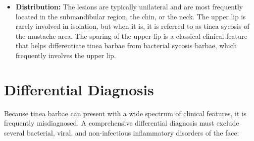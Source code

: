 \begin{itemize}
\begin{itemize}
        \item Symptoms of pain are minimal, though patients frequently report mild to moderate pruritus (itching) and a burning sensation, especially after shaving.
        \item Because the inflammation is superficial, systemic symptoms and scarring are generally absent, and hair growth typically returns to normal after successful treatment.
    \end{itemize}
    \item \textbf{Distribution:} The lesions are typically unilateral and are most frequently located in the submandibular region, the chin, or the neck. The upper lip is rarely involved in isolation, but when it is, it is referred to as tinea sycosis of the mustache area. The sparing of the upper lip is a classical clinical feature that helps differentiate tinea barbae from bacterial sycosis barbae, which frequently involves the upper lip.
\end{itemize}

\section*{Differential Diagnosis}
Because tinea barbae can present with a wide spectrum of clinical features, it is frequently misdiagnosed. A comprehensive differential diagnosis must exclude several bacterial, viral, and non-infectious inflammatory disorders of the face:


